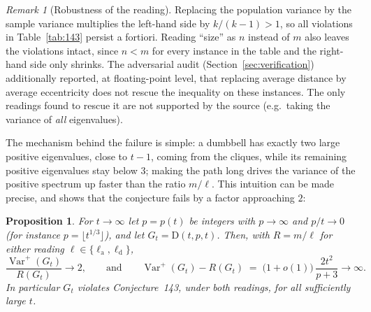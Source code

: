 \documentclass[11pt]{article}
\newtheorem{proposition}[theorem]{Proposition}
\theoremstyle{remark}
\newtheorem{remark}[theorem]{Remark}
\newcommand{\Varp}{\operatorname{Var}^{+}}
\newcommand{\la}{\ell_{\mathrm{a}}}
\newcommand{\ld}{\ell_{\mathrm{d}}}
\newcommand{\D}{\mathrm{D}}
\begin{document}
\begin{remark}[Robustness of the reading]\label{rem:143robust}
Replacing the population variance by the sample variance multiplies the
left-hand side by $k/(k-1) > 1$, so all violations in Table~\ref{tab:143}
persist a fortiori. Reading ``size'' as $n$ instead of $m$ also leaves the
violations intact, since $n < m$ for every instance in the table and the
right-hand side only shrinks. The adversarial audit
(Section~\ref{sec:verification}) additionally reported, at floating-point
level, that replacing average distance by average eccentricity does not
rescue the inequality on these instances. The only readings found to rescue
it are not supported by the source (e.g.\ taking the variance of \emph{all}
eigenvalues).
\end{remark}

The mechanism behind the failure is simple: a dumbbell has exactly two large
positive eigenvalues, close to $t-1$, coming from the cliques, while its
remaining positive eigenvalues stay below $3$; making the path long drives
the variance of the positive spectrum up faster than the ratio
$m/\ell$. This intuition can be made precise, and shows that the conjecture
fails by a factor approaching $2$:

\begin{proposition}\label{prop:143asymp}
For $t \to \infty$ let $p = p(t)$ be integers with $p \to \infty$ and
$p/t \to 0$ (for instance $p = \lfloor t^{1/3} \rfloor$), and let
$G_t = \D(t, p, t)$. Then, with $R = m/\ell$ for either reading
$\ell \in \{\la, \ld\}$,
\[
\frac{\Varp(G_t)}{R(G_t)} \longrightarrow 2,
\qquad\text{and}\qquad
\Varp(G_t) - R(G_t) \;=\; \bigl(1+o(1)\bigr)\,\frac{2t^2}{p+3}
\longrightarrow \infty .
\]
In particular $G_t$ violates Conjecture~143, under both readings, for all
sufficiently large $t$.
\end{proposition}
\end{document}
